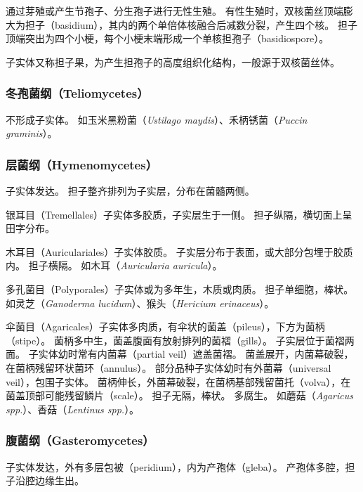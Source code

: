\documentclass[11pt]{article}
\begin{document}
\newline

通过芽殖或产生节孢子、分生孢子进行无性生殖。
有性生殖时，双核菌丝顶端膨大为担子（basidium），其内的两个单倍体核融合后减数分裂，产生四个核。
担子顶端突出为四个小梗，每个小梗末端形成一个单核担孢子（basidiospore）。

\newline

子实体又称担子果，为产生担孢子的高度组织化结构，一般源于双核菌丝体。

\subsubsection{冬孢菌纲（Teliomycetes）}
不形成子实体。
如玉米黑粉菌（\textit{Ustilago maydis}）、禾柄锈菌（\textit{Puccin graminis}）。

\subsubsection{层菌纲（Hymenomycetes）}
子实体发达。
担子整齐排列为子实层，分布在菌髓两侧。

\newline

银耳目（Tremellales）子实体多胶质，子实层生于一侧。
担子纵隔，横切面上呈田字分布。

\newline

木耳目（Auriculariales）子实体胶质。
子实层分布于表面，或大部分包埋于胶质内。
担子横隔。
如木耳（\textit{Auricularia auricula}）。

\newline

多孔菌目（Polyporales）子实体或为多年生，木质或肉质。
担子单细胞，棒状。
如灵芝（\textit{Ganoderma lucidum}）、猴头（\textit{Hericium erinaceus}）。

\newline

伞菌目（Agaricales）子实体多肉质，有伞状的菌盖（pileus），下方为菌柄（stipe）。
菌柄多中生，菌盖腹面有放射排列的菌褶（gills）。
子实层位于菌褶两面。
子实体幼时常有内菌幕（partial veil）遮盖菌褶。
菌盖展开，内菌幕破裂，在菌柄残留环状菌环（annulus）。
部分品种子实体幼时有外菌幕（universal veil），包围子实体。
菌柄伸长，外菌幕破裂，在菌柄基部残留菌托（volva），在菌盖顶部可能残留鳞片（scale）。
担子无隔，棒状。
多腐生。
如蘑菇（\textit{Agaricus spp.}）、香菇（\textit{Lentinus spp.}）。

\subsubsection{腹菌纲（Gasteromycetes）}
子实体发达，外有多层包被（peridium），内为产孢体（gleba）。
产孢体多腔，担子沿腔边缘生出。
\end{document}
